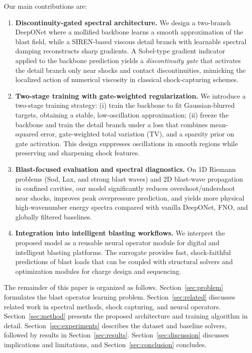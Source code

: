 \documentclass[a4paper,fleqn]{cas-dc}
\begin{document}
Our main contributions are:

\begin{enumerate}[label=(C\arabic*),leftmargin=*]
  \item \textbf{Discontinuity-gated spectral architecture.}
  We design a two-branch DeepONet where a mollified backbone learns a smooth approximation of the blast field, while a SIREN-based viscous detail branch with learnable spectral damping reconstructs sharp gradients.
  A Sobel-type gradient indicator applied to the backbone prediction yields a \emph{discontinuity gate} that activates the detail branch only near shocks and contact discontinuities, mimicking the localized action of numerical viscosity in classical shock-capturing schemes.
  \item \textbf{Two-stage training with gate-weighted regularization.}
  We introduce a two-stage training strategy: (i) train the backbone to fit Gaussian-blurred targets, obtaining a stable, low-oscillation approximation; (ii) freeze the backbone and train the detail branch under a loss that combines mean-squared error, gate-weighted total variation (TV), and a sparsity prior on gate activation.
  This design suppresses oscillations in smooth regions while preserving and sharpening shock features.
  \item \textbf{Blast-focused evaluation and spectral diagnostics.}
  On 1D Riemann problems (Sod, Lax, and strong blast waves) and 2D blast-wave propagation in confined cavities, our model significantly reduces overshoot/undershoot near shocks, improves peak overpressure prediction, and yields more physical high-wavenumber energy spectra compared with vanilla DeepONet, FNO, and globally filtered baselines.
  \item \textbf{Integration into intelligent blasting workflows.}
  We interpret the proposed model as a reusable neural operator module for digital and intelligent blasting platforms.
  The surrogate provides fast, shock-faithful predictions of blast loads that can be coupled with structural solvers and optimization modules for charge design and sequencing.
\end{enumerate}

The remainder of this paper is organized as follows.
Section~\ref{sec:problem} formulates the blast operator learning problem.
Section~\ref{sec:related} discusses related work in spectral methods, shock capturing, and neural operators.
Section~\ref{sec:method} presents the proposed architecture and training algorithm in detail.
Section~\ref{sec:experiments} describes the dataset and baseline solvers, followed by results in Section~\ref{sec:results}.
Section~\ref{sec:discussion} discusses implications and limitations, and Section~\ref{sec:conclusion} concludes.
\end{document}
